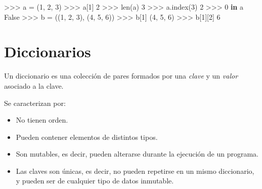 \documentclass[
  spanish,
  a4paper,
]{scrreport}
\newenvironment{Shaded}{\begin{snugshade}}{\end{snugshade}}
\newcommand{\BuiltInTok}[1]{\textcolor[rgb]{0.00,0.23,0.31}{#1}}
\newcommand{\DecValTok}[1]{\textcolor[rgb]{0.68,0.00,0.00}{#1}}
\newcommand{\KeywordTok}[1]{\textcolor[rgb]{0.00,0.23,0.31}{\textbf{#1}}}
\newcommand{\NormalTok}[1]{\textcolor[rgb]{0.00,0.23,0.31}{#1}}
\newcommand{\OperatorTok}[1]{\textcolor[rgb]{0.37,0.37,0.37}{#1}}
\newcommand{\VariableTok}[1]{\textcolor[rgb]{0.07,0.07,0.07}{#1}}
\providecommand{\tightlist}{%
  \setlength{\itemsep}{0pt}\setlength{\parskip}{0pt}}
\begin{document}
\begin{Shaded}
\begin{Highlighting}[]
\OperatorTok{\textgreater{}\textgreater{}\textgreater{}}\NormalTok{ a }\OperatorTok{=}\NormalTok{ (}\DecValTok{1}\NormalTok{, }\DecValTok{2}\NormalTok{, }\DecValTok{3}\NormalTok{)}
\OperatorTok{\textgreater{}\textgreater{}\textgreater{}}\NormalTok{ a[}\DecValTok{1}\NormalTok{]}
\DecValTok{2}
\OperatorTok{\textgreater{}\textgreater{}\textgreater{}} \BuiltInTok{len}\NormalTok{(a)}
\DecValTok{3}
\OperatorTok{\textgreater{}\textgreater{}\textgreater{}}\NormalTok{ a.index(}\DecValTok{3}\NormalTok{)}
\DecValTok{2}
\OperatorTok{\textgreater{}\textgreater{}\textgreater{}} \DecValTok{0} \KeywordTok{in}\NormalTok{ a}
\VariableTok{False}
\OperatorTok{\textgreater{}\textgreater{}\textgreater{}}\NormalTok{ b }\OperatorTok{=}\NormalTok{ ((}\DecValTok{1}\NormalTok{, }\DecValTok{2}\NormalTok{, }\DecValTok{3}\NormalTok{), (}\DecValTok{4}\NormalTok{, }\DecValTok{5}\NormalTok{, }\DecValTok{6}\NormalTok{))}
\OperatorTok{\textgreater{}\textgreater{}\textgreater{}}\NormalTok{ b[}\DecValTok{1}\NormalTok{]}
\NormalTok{(}\DecValTok{4}\NormalTok{, }\DecValTok{5}\NormalTok{, }\DecValTok{6}\NormalTok{)}
\OperatorTok{\textgreater{}\textgreater{}\textgreater{}}\NormalTok{ b[}\DecValTok{1}\NormalTok{][}\DecValTok{2}\NormalTok{]}
\DecValTok{6}
\end{Highlighting}
\end{Shaded}


\chapter{Diccionarios}\label{diccionarios}

Un diccionario es una colección de pares formados por una \emph{clave} y
un \emph{valor} asociado a la clave.

Se caracterizan por:

\begin{itemize}
\tightlist
\item
  No tienen orden.
\item
  Pueden contener elementos de distintos tipos.
\item
  Son mutables, es decir, pueden alterarse durante la ejecución de un
  programa.
\item
  Las claves son únicas, es decir, no pueden repetirse en un mismo
  diccionario, y pueden ser de cualquier tipo de datos inmutable.
\end{itemize}
\end{document}
